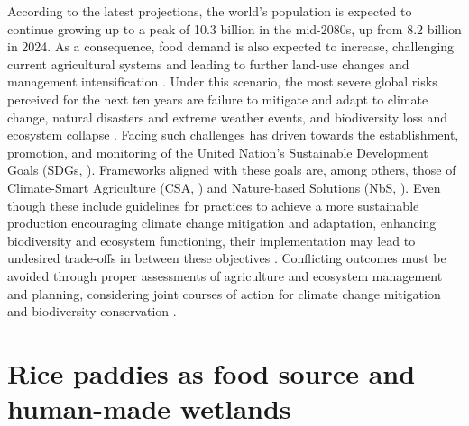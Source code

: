 According to the latest \cite{UN2024} projections, the world's population is expected to continue growing up to a peak of 10.3 billion in the mid-2080s, up from 8.2 billion in 2024. As a consequence, food demand is also expected to increase, challenging current agricultural systems and leading to further land-use changes and management intensification \citep{rogelj2018scenarios}. Under this scenario, the most severe global risks perceived for the next ten years are failure to mitigate and adapt to climate change, natural disasters and extreme weather events, and biodiversity loss and ecosystem collapse \citep{worldeconomicforum.2023}. Facing such challenges has driven towards the establishment, promotion, and monitoring of the United Nation's Sustainable Development Goals (SDGs, \cite{unitednations2015}). Frameworks aligned with these goals are, among others, those of Climate-Smart Agriculture (CSA, \cite{fao2011climate}) and Nature-based Solutions (NbS, \cite{noauthor_2020-su}). Even though these include guidelines for practices to achieve a more sustainable production encouraging climate change mitigation and adaptation, enhancing biodiversity and ecosystem functioning, their implementation may lead to undesired trade-offs in between these objectives \citep{seddon2019, smith2022, tripathi2022}. Conflicting outcomes must be avoided through proper assessments of agriculture and ecosystem management and planning, considering joint courses of action for climate change mitigation and biodiversity conservation \citep{rusch2022}. %
 
\section*{Rice paddies as food source and human-made wetlands}

